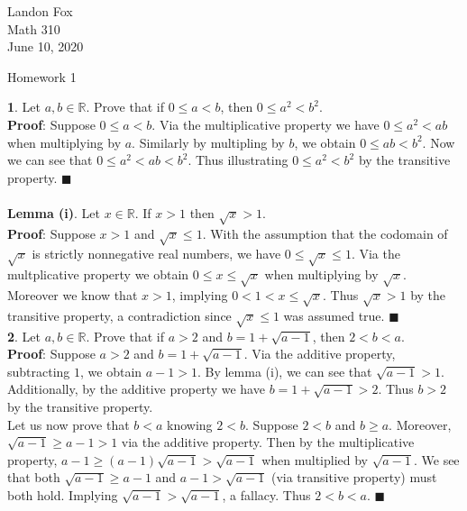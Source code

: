 \documentclass[ 12pt ]{article}
\begin{document}
\noindent Landon Fox \\
\noindent Math 310 \\
\noindent June 10, 2020

\begin{center}
\Large Homework 1
\end{center}

\noindent \textbf{1}. Let $a,b \in \mathbb{R}$. Prove that if $0 \leq a < b$, then
	$0 \leq a^2 < b^2$. \\

\noindent \textbf{Proof}: Suppose $0 \leq a < b$. Via the multiplicative property
	we have $0 \leq a^2 < ab$ when multiplying by $a$. Similarly by multipling by
	$b$, we obtain $0 \leq ab < b^2$. Now we can see that $0 \leq a^2 < ab < b^2$.
	Thus illustrating $0 \leq a^2 < b^2$ by the transitive property.
	$\blacksquare$ \\ \\


\noindent \textbf{Lemma (i)}. Let $x \in \mathbb{R}$. If $x > 1$ then
	$\sqrt{x} > 1$. \\

\noindent \textbf{Proof}: Suppose $x > 1$ and $\sqrt{x} \leq 1$. With the
	assumption that the codomain of $\sqrt{x}$ is strictly nonnegative real
	numbers, we have $0 \leq \sqrt{x} \leq 1$. Via the multplicative property
	we obtain $0 \leq x \leq \sqrt{x}$ when multiplying by $\sqrt{x}$. Moreover
	we know that $x > 1$, implying $0 < 1 < x \leq \sqrt{x}$. Thus
	$\sqrt{x} > 1$ by the transitive property, a contradiction since 
	$\sqrt{x} \leq 1$ was assumed true. $\blacksquare$ \\

\noindent \textbf{2}. Let $a,b \in \mathbb{R}$. Prove that if $a > 2$ and
	$b = 1 + \sqrt{a - 1}$, then $2 < b < a$. \\

\noindent \textbf{Proof}: Suppose $a > 2$ and $b = 1 + \sqrt{a - 1}$. Via the
	additive property, subtracting $1$, we obtain $a - 1 > 1$. By lemma (i),
	we can see that $\sqrt{a - 1} > 1$. Additionally, by the additive property we
	have $b = 1 + \sqrt{a - 1} > 2$. Thus $b > 2$ by the transitive property. \\

\noindent Let us now prove that $b < a$ knowing $2 < b$. Suppose $2 < b$ and
	$b \geq a$. Moreover, $\sqrt{a - 1} \geq a - 1 > 1$ via the additive
	property. Then by the multiplicative property,
	$a - 1 \geq (a - 1)\sqrt{a - 1} > \sqrt{a - 1}$ when multiplied by
	$\sqrt{a - 1}$. We see that both $\sqrt{a - 1} \geq a - 1$ and
	$a - 1 > \sqrt{a - 1}$ (via transitive property) must both hold. Implying
	$\sqrt{a - 1} > \sqrt{a - 1}$, a fallacy. Thus $2 < b < a$. $\blacksquare$ \\ \\
\end{document}
